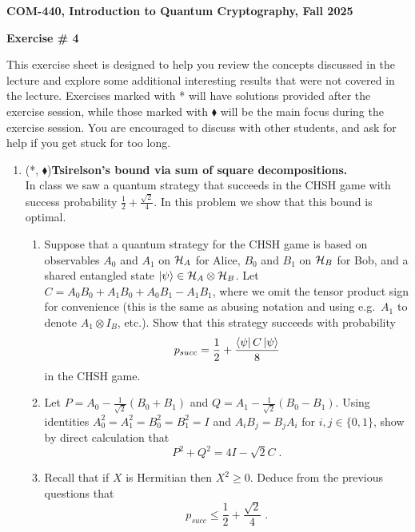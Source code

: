 \documentclass[12pt]{article}
\newcommand{\header}[1]{\begin{center} {\large\bf #1} \end{center}}
\begin{document}
\header{COM-440, Introduction to Quantum Cryptography, Fall 2025}
\header{\bf Exercise \# 4}

This exercise sheet is designed to help you review the concepts discussed in the lecture and explore some additional interesting results that were not covered in the lecture. Exercises marked with * will have solutions provided after the exercise session, while those marked with $\blacklozenge$ will be the main focus during the exercise session. You are encouraged to discuss with other students, and ask for help if you get stuck for too long.

\begin{enumerate}
\item (*, $\blacklozenge$)\textbf{Tsirelson's bound via sum of square decompositions. }\\
In class we saw a quantum strategy that succeeds in the CHSH game with success probability $\frac12+\frac{\sqrt{2}}{4}$. In this problem we show that this bound is optimal. 
\begin{enumerate}
\item Suppose that a quantum strategy for the CHSH game is based on observables $A_0$ and $A_1$ on $\mathcal{H}_A$ for Alice, $B_0$ and $B_1$ on $\mathcal{H}_B$ for Bob, and a shared entangled state $\ket{\psi}\in \mathcal{H}_A\otimes \mathcal{H}_B$. Let $C = A_0B_0 + A_1B_0 + A_0B_1-A_1B_1$, where we omit the tensor product sign for convenience (this is the same as abusing notation and using e.g.\ $A_1$ to denote $A_1 \otimes I_B$, etc.). Show that this strategy succeeds with probability 
\begin{equation}\label{eq:ps}
 p_{succ} = \frac{1}{2} + \frac{\bra{\psi} C \ket{\psi}}{8} 
\end{equation}
in the CHSH game. 
\item Let $P = A_0 - \frac{1}{\sqrt{2}}(B_0+B_1)$ and $Q= A_1 - \frac{1}{\sqrt{2}}(B_0-B_1)$. Using identities $A_0^2=A_1^2=B_0^2=B_1^2=I$ and $A_iB_j=B_jA_i$ for $i,j\in\{0,1\}$, show by direct calculation that 
\[P^2 + Q^2 = 4I - \sqrt{2}C\;.\]
\item Recall that if $X$ is Hermitian then $X^2 \geq 0$. Deduce from the previous questions that 
\[ p_{succ} \leq \frac12+\frac{\sqrt{2}}{4}\;.\]
\end{enumerate}


\end{enumerate}
\end{document}
